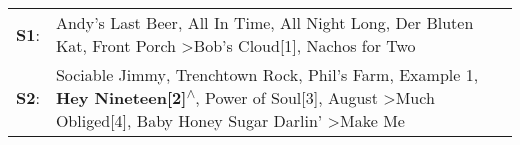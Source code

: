 \begin{supertabular}{p{0.03\textwidth}p{0.92\textwidth}}
 \textbf{S1}:  &                                                                                                                                                            Andy's Last Beer\textsuperscript{}, \enspace All In Time\textsuperscript{}, \enspace All Night Long\textsuperscript{}, \enspace Der Bluten Kat\textsuperscript{}, \enspace Front Porch\textsuperscript{} \textgreater \enspace Bob's Cloud[1]\textsuperscript{}, \enspace Nachos for Two\textsuperscript{}  \enspace  \\
 \textbf{S2}:  &  Sociable Jimmy\textsuperscript{}, \enspace Trenchtown Rock\textsuperscript{}, \enspace Phil's Farm\textsuperscript{}, \enspace Example 1\textsuperscript{}, \enspace \textbf{Hey Nineteen[2]\textsuperscript{$\wedge$}}, \enspace Power of Soul[3]\textsuperscript{}, \enspace August\textsuperscript{} \textgreater \enspace Much Obliged[4]\textsuperscript{}, \enspace Baby Honey Sugar Darlin'\textsuperscript{} \textgreater \enspace Make Me\textsuperscript{}  \enspace  \\
\end{supertabular}

